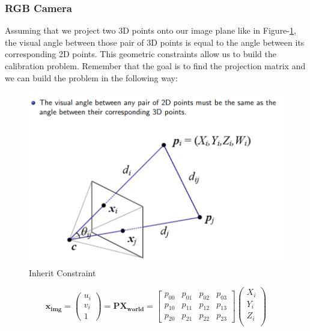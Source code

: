 \documentclass[a4paper]{report}
\numberwithin{figure}{section}
\begin{document}
\subsubsection{RGB Camera}

Assuming that we project two 3D points onto our image plane
like in Figure-\ref{fig:calibration_constraint},
the visual angle between those pair of 3D points is equal to 
the angle between its corresponding 2D points. This geometric constraints 
allow us to build the calibration problem. Remember that the goal is to find 
the projection matrix and we can build the problem in the following way:

\begin{figure}[H]
	\centering
  \includegraphics[width=\linewidth,natwidth=640,natheight=640]
  {fig/ref_imgs/calibration_dlt.png}
  \caption{Inherit Constraint}
  \label{fig:calibration_constraint}
\end{figure}


\begin{equation}
  \mathbf{x_{img}} = 
  \begin{pmatrix}
    u_i\\
    v_i\\
    1
  \end{pmatrix}
  =
  \mathbf{P}\mathbf{X_{world}} = 
  \begin{bmatrix}
    p_{00} & p_{01} & p_{02} & p_{03}\\
    p_{10} & p_{11} & p_{12} & p_{13}\\
    p_{20} & p_{21} & p_{22} & p_{23}
  \end{bmatrix}
  \begin{pmatrix}
    X_i\\
    Y_i\\
    Z_i\\
  \end{pmatrix}
\end{equation} \label{eq:proj_matrix}
\end{document}
